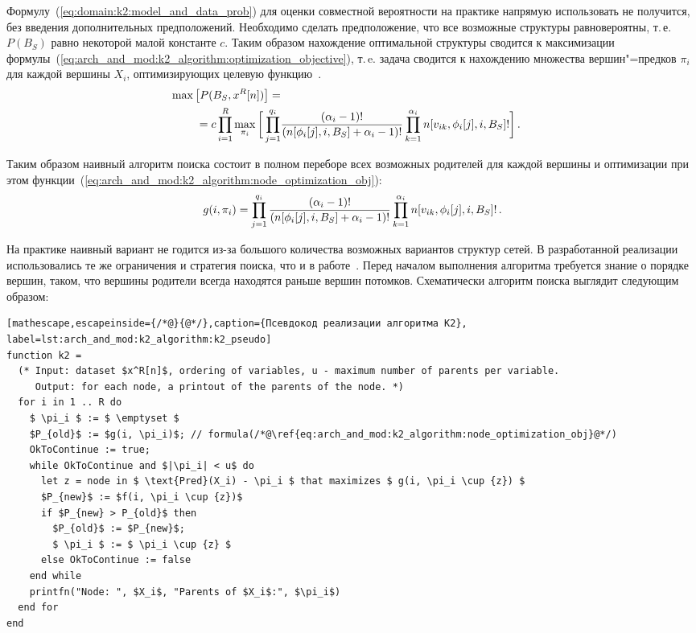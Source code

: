 Формулу~(\ref{eq:domain:k2:model_and_data_prob}) для оценки совместной вероятности на практике напрямую использовать не получится, без введения дополнительных предположений.
Необходимо сделать предположение, что все возможные структуры равновероятны, т.\,е. $P(B_S)$ равно некоторой малой константе $c$.
Таким образом нахождение оптимальной структуры сводится к максимизации формулы~(\ref{eq:arch_and_mod:k2_algorithm:optimization_objective}), т.\,e. задача сводится к нахождению множества вершин"=предков $ \pi_i $ для каждой вершины $X_i$, оптимизирующих целевую функцию~\cite{Cooper1991}.
\begin{align}
  \label{eq:arch_and_mod:k2_algorithm:optimization_objective}
  \max \left[ P(B_S, x^R[n]) \right] = \notag\\
  =
    c \prod_{i = 1}^{R} \max_{\pi_i}
    \bigg[
      \prod_{j = 1}^{q_i} &%
      \frac{(\alpha_i - 1)!}
           {(n[\phi_i[j], i, B_S] + \alpha_i - 1)!}
      \prod_{k = 1}^{\alpha_i}
        n[v_{ik}, \phi_i[j], i, B_S]!
    \bigg] \text{\,.}
\end{align}

Таким образом наивный алгоритм поиска состоит в полном переборе всех возможных родителей для каждой вершины и оптимизации при этом функции~(\ref{eq:arch_and_mod:k2_algorithm:node_optimization_obj}):
\begin{equation}
  \label{eq:arch_and_mod:k2_algorithm:node_optimization_obj}
  g(i, \pi_i) =
    \prod_{j = 1}^{q_i}
      \frac{(\alpha_i - 1)!}
           {(n[\phi_i[j], i, B_S] + \alpha_i - 1)!}
      \prod_{k = 1}^{\alpha_i}
        n[v_{ik}, \phi_i[j], i, B_S]! \text{\,.}
\end{equation}

На практике наивный вариант не годится из-за большого количества возможных вариантов структур сетей.
В разработанной реализации использовались те же ограничения и стратегия поиска, что и в работе~\cite{Cooper1991}.
Перед началом выполнения алгоритма требуется знание о порядке вершин, таком, что вершины родители всегда находятся раньше вершин потомков.
Схематически алгоритм поиска выглядит следующим образом:

\begin{lstlisting}[mathescape,escapeinside={/*@}{@*/},caption={Псевдокод реализации алгоритма К2}, label=lst:arch_and_mod:k2_algorithm:k2_pseudo]
function k2 =
  (* Input: dataset $x^R[n]$, ordering of variables, u - maximum number of parents per variable.
     Output: for each node, a printout of the parents of the node. *)
  for i in 1 .. R do
    $ \pi_i $ := $ \emptyset $
    $P_{old}$ := $g(i, \pi_i)$; // formula(/*@\ref{eq:arch_and_mod:k2_algorithm:node_optimization_obj}@*/)
    OkToContinue := true;
    while OkToContinue and $|\pi_i| < u$ do
      let z = node in $ \text{Pred}(X_i) - \pi_i $ that maximizes $ g(i, \pi_i \cup {z}) $
      $P_{new}$ := $f(i, \pi_i \cup {z})$
      if $P_{new} > P_{old}$ then
        $P_{old}$ := $P_{new}$;
        $ \pi_i $ := $ \pi_i \cup {z} $
      else OkToContinue := false
    end while
    printfn("Node: ", $X_i$, "Parents of $X_i$:", $\pi_i$)
  end for
end
\end{lstlisting}

